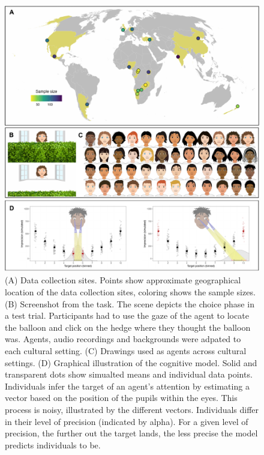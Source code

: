 \documentclass[
  man,floatsintext]{apa6}
\begin{document}
\begin{figure}

{\centering \includegraphics[width=0.75\linewidth]{../visuals/fig1} 

}

\caption{(A) Data collection sites. Points show approximate geographical location of the data collection sites, coloring shows the sample sizes. (B) Screenshot from the task. The scene depicts the choice phase in a test trial. Participants had to use the gaze of the agent to locate the balloon and click on the hedge where they thought the balloon was. Agents, audio recordings and backgrounds were adpated to each cultural setting. (C) Drawings used as agents across cultural settings. (D) Graphical illustration of the cognitive model. Solid and transparent dots show simualted means and individual data points. Individuals infer the target of an agent's attention by estimating a vector based on the position of the pupils within the eyes. This process is noisy, illustrated by the different vectors. Individuals differ in their level of precision (indicated by alpha). For a given level of precision, the further out the target lands, the less precise the model predicts individuals to be.}\label{fig:fig1}
\end{figure}
\end{document}
